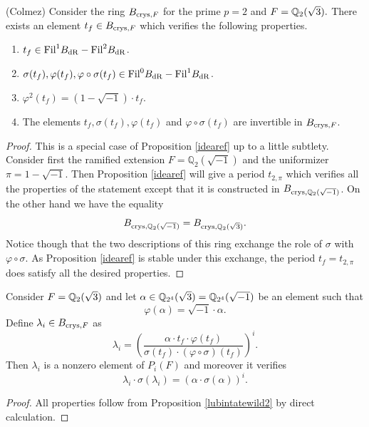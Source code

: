\documentclass[11pt]{amsart}
\begin{document}
\begin{prop}\label{lubintatewild2} (Colmez)
Consider the ring $B_{\textnormal{crys},F}$ for the prime $p=2$ and $F=\mathbb{Q}_2(\sqrt{3}).$
There  exists an element $t_{f} \in B_{\textnormal{crys},F}$ which verifies the following properties.
\begin{enumerate}
\item $t_{f} \in \textnormal{Fil} ^{1} B_{\mathrm{dR}}-\textnormal{Fil} ^{2} B_{\mathrm{dR}}$.
\item $\sigma (t_{f}) , \varphi (t_{f}) , \varphi \circ \sigma (t_{f}) \in \textnormal{Fil} ^{0} B_{\mathrm{dR}}-\textnormal{Fil} ^{1} B_{\mathrm{dR}}$.
\item  $ \varphi^2(t_{f}) = (1-\sqrt{-1})  \cdot t_{f}$.
\item The elements $t_{f}  ,  \sigma(t_{f} ), \varphi (t_{f} )$ and $ \varphi \circ \sigma (t_{f} )  $ are invertible in $B_{\textnormal{crys},F}$.
\end{enumerate}
\end{prop}
\begin{proof}
This is a special case of Proposition \ref{idearef} up to a little subtlety. Consider first the ramified extension $F=\mathbb{Q}_2(\sqrt{-1})$ and the uniformizer $\pi= 1-\sqrt{-1}. $ Then Proposition  \ref{idearef}  will give a period $t_{2,\pi}$ which verifies all the properties of the statement except that it is constructed in $B_{\textnormal{crys},\mathbb{Q}_2(\sqrt{-1})}$. On the other hand we have the equality \[B_{\textnormal{crys},\mathbb{Q}_2(\sqrt{-1})} = B_{\textnormal{crys},\mathbb{Q}_2(\sqrt{3})}.\]
Notice though that the two descriptions of this ring exchange the role of $ \sigma $ with $ \varphi \circ \sigma$. As  Proposition \ref{idearef}  is stable under this exchange, the period $t_f=t_{2,\pi}$ does satisfy all the desired properties.
\end{proof}
\begin{corollary}\label{brinonwild2}
  Consider $F=\mathbb{Q}_2(\sqrt{3})$ and let $\alpha \in \mathbb{Q}_{2^4}(\sqrt{3})=\mathbb{Q}_{2^4}(\sqrt{-1})$ be an element  such that
\[\varphi(\alpha) =  \sqrt{-1} \cdot \alpha.\]
Define $\lambda_i \in B_{\textnormal{crys},F}$ as
\[\lambda_i = \left(\frac{\alpha \cdot t_{f} \cdot \varphi(t_{f}) }{\sigma(t_{f})   \cdot (\varphi \circ \sigma) (t_{f})}\right)^i .\]
Then $\lambda_i$ is a nonzero element of  $P_{i}(F)$ and  moreover it verifies
\[\lambda_i \cdot\sigma(\lambda_i) = (\alpha  \cdot \sigma(\alpha))^i.\] 
\end{corollary}
\begin{proof}
All properties follow from Proposition \ref{lubintatewild2}  by direct calculation.
\end{proof}
\end{document}
